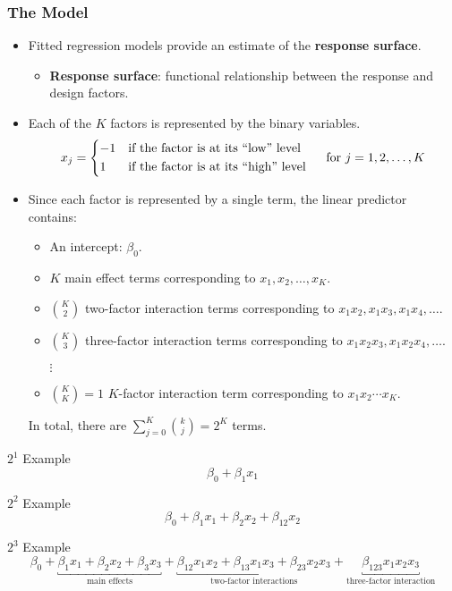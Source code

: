 \subsubsection*{The Model}
\begin{itemize}
    \item Fitted regression models provide an estimate of the \textbf{response surface}.
          \begin{itemize}[$\hookrightarrow$]
              \item \textbf{Response surface}: functional relationship between the response and design factors.
          \end{itemize}
    \item Each of the $K$ factors is represented by the binary variables.
          \[ x_j=\begin{cases*}
                  -1 & if the factor is at its ``low'' level  \\
                  1  & if the factor is at its ``high'' level
              \end{cases*}\quad \text{for }j=1,2,\ldots,K \]
    \item Since each factor is represented by a single term, the linear predictor contains:
          \begin{itemize}
              \item An intercept: $ \beta_0 $.
              \item $ K $ main effect terms corresponding to $ x_1,x_2,\ldots,x_K $.
              \item $ \binom{K}{2} $ two-factor interaction terms corresponding to $ x_1x_2,x_1x_3,x_1x_4,\ldots $.
              \item $ \binom{K}{3} $ three-factor interaction terms corresponding to $ x_1x_2x_3,x_1x_2x_4,\ldots $.
              \item[$\vdots$]
              \item $ \binom{K}{K}=1 $ $ K $-factor interaction term corresponding to $ x_1x_2\cdots x_K $.
          \end{itemize}
          In total, there are $ \sum_{j=0}^{K} \binom{k}{j}=2^K $ terms.
\end{itemize}
\begin{Example}{$ 2^1 $ Example}{}
    \[ \beta_0+\beta_1x_1 \]
\end{Example}
\begin{Example}{$ 2^2 $ Example}{}
    \[ \beta_0+\beta_1x_1+\beta_2x_2+\beta_{12}x_2 \]
\end{Example}
\begin{Example}{$ 2^3 $ Example}{}
    \[ \beta_0+\underbracket{\beta_1x_1+\beta_2x_2+\beta_3x_3}_{\text{main effects}}+
        \underbracket{\beta_{12}x_1x_2+\beta_{13}x_1x_3+\beta_{23}x_2x_3}_{\text{two-factor interactions}}+
        \underbracket{\beta_{123}x_1x_2x_3}_{\text{three-factor interaction}} \]
\end{Example}
